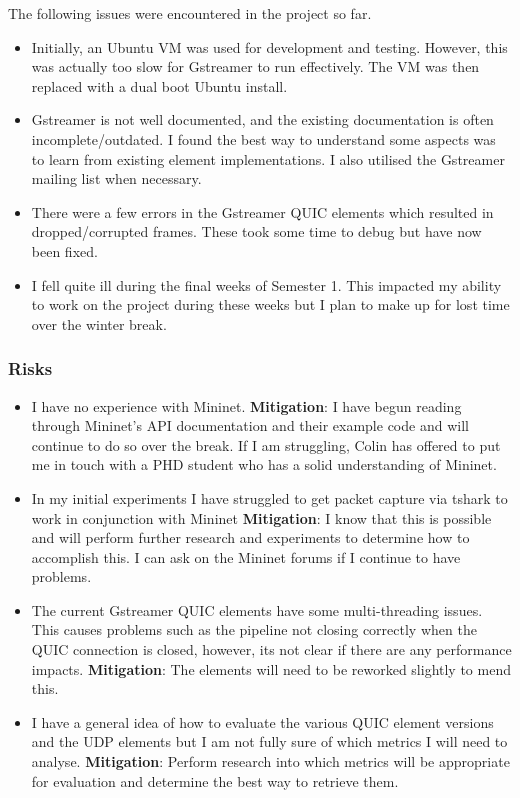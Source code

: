 \documentclass[11pt]{article}
\begin{document}
The following issues were encountered in the project so far.
\begin{itemize}
\item Initially, an Ubuntu VM was used for development and testing. However, this was actually
too slow for Gstreamer to run effectively. The VM was then replaced with a dual boot Ubuntu install.
\item Gstreamer is not well documented, and the existing documentation is often incomplete/outdated. I found the best way to understand some aspects was to learn from existing element implementations. I also utilised the Gstreamer mailing list when necessary.
\item There were a few errors in the Gstreamer QUIC elements which resulted in dropped/corrupted frames. These took some time to debug but have now been fixed.
\item I fell quite ill during the final weeks of Semester 1. This impacted my ability to work on the project during these weeks but I plan to make up for lost time over the winter break.
\end{itemize}

\subsubsection{Risks}\label{risks}

\begin{itemize}
\item I have no experience with Mininet. \textbf{Mitigation}: I have begun reading through Mininet's API documentation and their example code and will continue to do so over the break. If I am struggling, Colin has offered to put me in touch with a PHD student who has a solid understanding of Mininet.
\item In my initial experiments I have struggled to get packet capture via tshark to work in conjunction with Mininet \textbf{Mitigation}: I know that this is possible and will perform further research and experiments to determine how to accomplish this. I can ask on the Mininet forums if I continue to have problems.
\item The current Gstreamer QUIC elements have some multi-threading issues. This causes problems such as 
the pipeline not closing correctly when the QUIC connection is closed, however, its not clear if there are 
any performance impacts. \textbf{Mitigation}: The elements will need to be reworked slightly to mend this.
\item I have a general idea of how to evaluate the various QUIC element versions and the UDP elements but I am not fully sure of which metrics I will need to analyse. \textbf{Mitigation}: Perform research into which metrics will be appropriate for evaluation and determine the best way to retrieve them.
\end{itemize}
    
\end{document}
